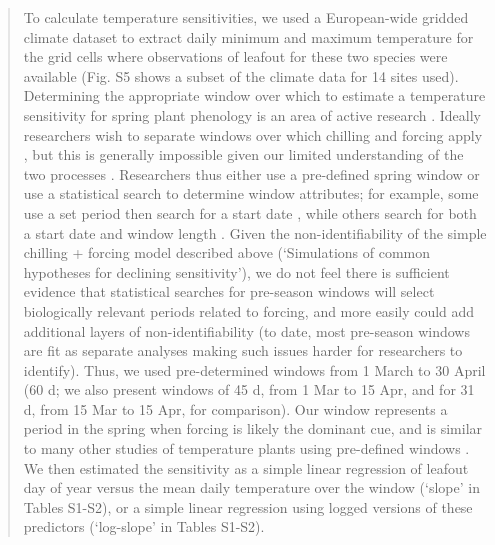 \documentclass[11pt]{article}
\begin{document}
\begin{quote}
To calculate temperature sensitivities, we used a European-wide gridded climate dataset \emph{\citep[{\normalfont E-OBS},][]{cornes2018}} to extract daily minimum and maximum temperature for the grid cells where observations of leafout for these two species were available (Fig. S5 shows a subset of the climate data for 14 sites used). Determining the appropriate window over which to estimate a temperature sensitivity for spring plant phenology is an area of active research \citep{gusewell2017,xupreseason2018}. Ideally researchers wish to separate windows over which chilling and forcing apply \citep[if they can be cleanly separated,][]{linkosala2008,lundell2020}, but this is generally impossible given our limited understanding of the two processes \citep{chuine2016}. Researchers thus either use a pre-defined spring window \citep[e.g.,][]{zhnag2015,park2018remsens,Park2019,kopp2020} or use a statistical search to determine window attributes; for example, some use a set period then search for a start date \citep[e.g.,][]{Cook:2012pnas,wang2015ecoind}, while others search for both a start date and window length \citep[e.g.,][]{fu2015,tansey2017}. Given the non-identifiability of the simple chilling + forcing model described above (`Simulations of common hypotheses for declining sensitivity'), we do not feel there is sufficient evidence that statistical searches for pre-season windows will select biologically relevant periods related to forcing, and more easily could add additional layers of non-identifiability (to date, most pre-season windows are fit as separate analyses making such issues harder for researchers to identify). Thus, we used pre-determined windows from 1 March to 30 April (60 d; we also present windows of 45 d, from 1 Mar to 15 Apr, and for 31 d, from 15 Mar to 15 Apr, for comparison). Our window represents a period in the spring when forcing is likely the dominant cue, and is similar to many other studies of temperature plants using pre-defined windows \citep[e.g.,][]{prevey2017,Park2019}. We then estimated the sensitivity as a simple linear regression of leafout day of year versus the mean daily temperature over the window (`slope' in Tables S1-S2), or a simple linear regression using logged versions of these predictors (`log-slope' in Tables S1-S2). \\
\end{quote}
\end{document}

